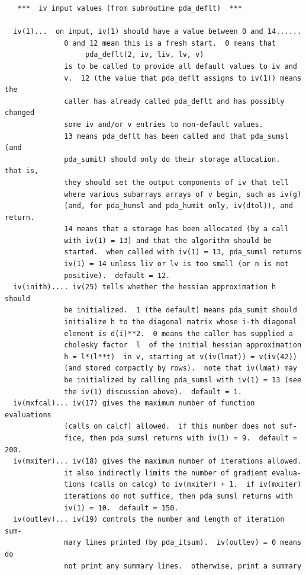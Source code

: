 \documentclass[11pt,twoside]{article}
\begin{document}
\begin{verbatim}
   ***  iv input values (from subroutine pda_deflt)  ***

  iv(1)...  on input, iv(1) should have a value between 0 and 14......
              0 and 12 mean this is a fresh start.  0 means that
                   pda_deflt(2, iv, liv, lv, v)
              is to be called to provide all default values to iv and
              v.  12 (the value that pda_deflt assigns to iv(1)) means the
              caller has already called pda_deflt and has possibly changed
              some iv and/or v entries to non-default values.
              13 means pda_deflt has been called and that pda_sumsl (and
              pda_sumit) should only do their storage allocation.  that is,
              they should set the output components of iv that tell
              where various subarrays arrays of v begin, such as iv(g)
              (and, for pda_humsl and pda_humit only, iv(dtol)), and return.
              14 means that a storage has been allocated (by a call
              with iv(1) = 13) and that the algorithm should be
              started.  when called with iv(1) = 13, pda_sumsl returns
              iv(1) = 14 unless liv or lv is too small (or n is not
              positive).  default = 12.
  iv(inith).... iv(25) tells whether the hessian approximation h should
              be initialized.  1 (the default) means pda_sumit should
              initialize h to the diagonal matrix whose i-th diagonal
              element is d(i)**2.  0 means the caller has supplied a
              cholesky factor  l  of the initial hessian approximation
              h = l*(l**t)  in v, starting at v(iv(lmat)) = v(iv(42))
              (and stored compactly by rows).  note that iv(lmat) may
              be initialized by calling pda_sumsl with iv(1) = 13 (see
              the iv(1) discussion above).  default = 1.
  iv(mxfcal)... iv(17) gives the maximum number of function evaluations
              (calls on calcf) allowed.  if this number does not suf-
              fice, then pda_sumsl returns with iv(1) = 9.  default = 200.
  iv(mxiter)... iv(18) gives the maximum number of iterations allowed.
              it also indirectly limits the number of gradient evalua-
              tions (calls on calcg) to iv(mxiter) + 1.  if iv(mxiter)
              iterations do not suffice, then pda_sumsl returns with
              iv(1) = 10.  default = 150.
  iv(outlev)... iv(19) controls the number and length of iteration sum-
              mary lines printed (by pda_itsum).  iv(outlev) = 0 means do
              not print any summary lines.  otherwise, print a summary

\end{verbatim}
\end{document}
